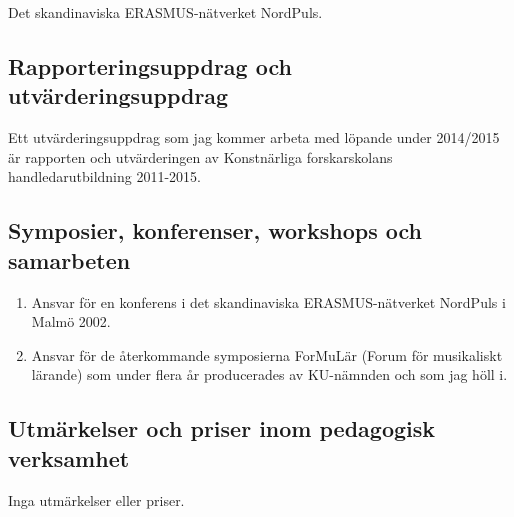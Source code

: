 Det skandinaviska ERASMUS-nätverket NordPuls.

\subsection*{\textsf{Rapporteringsuppdrag och utvärderingsuppdrag}}

Ett utvärderingsuppdrag som jag kommer arbeta med löpande under 2014/2015 är rapporten och utvärderingen av Konstnärliga forskarskolans handledarutbildning 2011-2015.

\subsection*{\textsf{Symposier, konferenser, workshops och samarbeten}}

\begin{enumerate}
\item Ansvar för en konferens i det skandinaviska
  ERASMUS-nätverket NordPuls i Malmö 2002.
\item Ansvar för de återkommande symposierna ForMuLär (Forum för musikaliskt lärande) som under flera år producerades av KU-nämnden och som jag höll i.
\end{enumerate}


\subsection*{\textsf{Utmärkelser och priser inom pedagogisk verksamhet}}

Inga utmärkelser eller priser.



